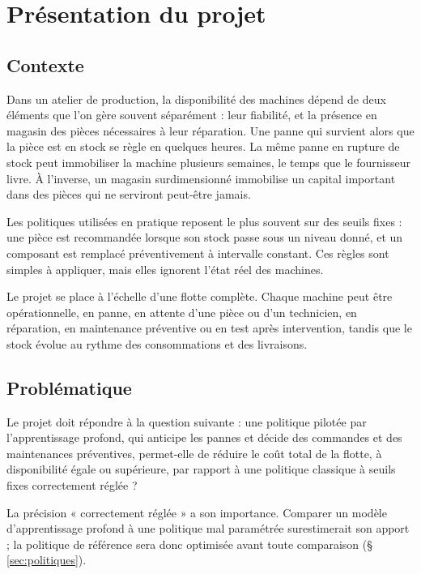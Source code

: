 \documentclass[11pt,a4paper]{article}
\begin{document}
\vspace{1.2cm}
\tableofcontents
\newpage

\section{Présentation du projet}

\subsection{Contexte}

Dans un atelier de production, la disponibilité des machines dépend de deux éléments que l'on gère souvent séparément : leur fiabilité, et la présence en magasin des pièces nécessaires à leur réparation. Une panne qui survient alors que la pièce est en stock se règle en quelques heures. La même panne en rupture de stock peut immobiliser la machine plusieurs semaines, le temps que le fournisseur livre. À l'inverse, un magasin surdimensionné immobilise un capital important dans des pièces qui ne serviront peut-être jamais.

Les politiques utilisées en pratique reposent le plus souvent sur des seuils fixes : une pièce est recommandée lorsque son stock passe sous un niveau donné, et un composant est remplacé préventivement à intervalle constant. Ces règles sont simples à appliquer, mais elles ignorent l'état réel des machines.

Le projet se place à l'échelle d'une flotte complète. Chaque machine peut être opérationnelle, en panne, en attente d'une pièce ou d'un technicien, en réparation, en maintenance préventive ou en test après intervention, tandis que le stock évolue au rythme des consommations et des livraisons.

\subsection{Problématique}

Le projet doit répondre à la question suivante : une politique pilotée par l'apprentissage profond, qui anticipe les pannes et décide des commandes et des maintenances préventives, permet-elle de réduire le coût total de la flotte, à disponibilité égale ou supérieure, par rapport à une politique classique à seuils fixes correctement réglée ?

La précision « correctement réglée » a son importance. Comparer un modèle d'apprentissage profond à une politique mal paramétrée surestimerait son apport ; la politique de référence sera donc optimisée avant toute comparaison (§\,\ref{sec:politiques}).
\end{document}
